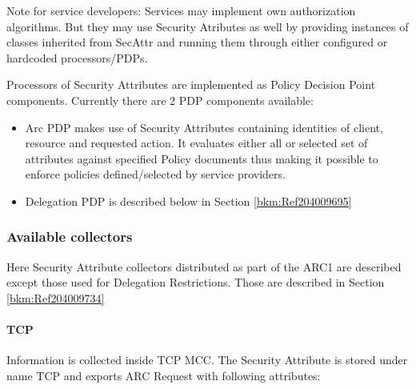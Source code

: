 \documentclass[a4paper]{article}
\newcommand\liststyleWWviiiNumviii{%
\renewcommand\labelitemi{[F0B7?]}
\renewcommand\labelitemii{[F081?]}
\renewcommand\labelitemiii{${\blacksquare}$}
\renewcommand\labelitemiv{[F06C?]}
}
\begin{document}
{\upshape\color{black}
Note for service developers: Services may implement own authorization
algorithms. But they may use Security Atributes as well by providing
instances of classes inherited from SecAttr and running them through
either configured or hardcoded processors/PDPs.}

{\upshape\color{black}
Processors of Security Attributes are implemented as Policy Decision
Point components. Currently there are 2 PDP components available:}

\liststyleWWviiiNumviii
\begin{itemize}
\item {\color{black}
Arc PDP makes use of Security Attributes containing identities of
client, resource and requested action. It evaluates either all or
selected set of attributes against specified Policy documents thus
making it possible to enforce policies defined/selected by service
providers. }
\item {\color{black}
Delegation PDP is described below in Section \ref{bkm:Ref204009695}}
\end{itemize}
\subsubsection[Available collectors]{Available collectors}
\label{bkm:Ref204009636}{\upshape\color{black}
Here Security Attribute collectors distributed as part of the ARC1 are
described except those used for Delegation Restrictions. Those are
described in Section \ref{bkm:Ref204009734}}

\paragraph{TCP}
{\upshape\color{black}
Information is collected inside TCP MCC. The Security Attribute is
stored under name {\textquotesingle}TCP{\textquotesingle} and exports
ARC Request with following attributes:}
\end{document}
